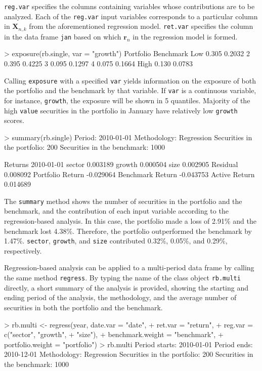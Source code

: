 \texttt{reg.var} specifies the columns containing variables whose
contributions are to be analyzed. Each of the \texttt{reg.var} input
variables corresponds to a particular column in $\mathbf{X}_{n,k}$
from the aforementioned regression model. \texttt{ret.var} specifies
the column in the data frame \texttt{jan} based on which
$\mathbf{r}_n$ in the regression model is formed.
\begin{smallverbatim}
> exposure(rb.single, var = "growth")
     Portfolio Benchmark
Low      0.305    0.2032
2        0.395    0.4225
3        0.095    0.1297
4        0.075    0.1664
High     0.130    0.0783
\end{smallverbatim}

Calling \texttt{exposure} with a specified \texttt{var} yields
information on the exposure of both the portfolio and the benchmark by
that variable. If \texttt{var} is a continuous variable, for instance,
\texttt{growth}, the exposure will be shown in 5 quantiles. Majority
of the high \texttt{value} securities in the portfolio in January have
relatively low \texttt{growth} scores.
\begin{smallverbatim}
> summary(rb.single)
Period:                            2010-01-01
Methodology:                       Regression
Securities in the portfolio:       200
Securities in the benchmark:       1000

Returns 
                 2010-01-01
sector             0.003189
growth             0.000504
size               0.002905
Residual           0.008092
Portfolio Return  -0.029064
Benchmark Return  -0.043753
Active Return      0.014689
\end{smallverbatim}

The \texttt{summary} method shows the number of securities in the
portfolio and the benchmark, and the contribution of each input
variable according to the regression-based analysis. In this case, the
portfolio made a loss of 2.91\% and the benchmark lost
4.38\%. Therefore, the portfolio outperformed the benchmark by
1.47\%. \texttt{sector}, \texttt{growth}, and \texttt{size}
contributed 0.32\%, 0.05\%, and 0.29\%, respectively.

Regression-based analysis can be applied to a multi-period data frame
by calling the same method \texttt{regress}. By typing the name of the
class object \texttt{rb.multi} directly, a short summary of the
analysis is provided, showing the starting and ending period of the
analysis, the methodology, and the average number of securities in
both the portfolio and the benchmark.
\begin{smallverbatim}
> rb.multi <- regress(year, date.var = "date",
+         ret.var = "return",
+         reg.var = c("sector", "growth", 
+                     "size"),
+         benchmark.weight = "benchmark",
+         portfolio.weight = "portfolio")
> rb.multi
Period starts:                     2010-01-01
Period ends:                       2010-12-01
Methodology:                       Regression
Securities in the portfolio:       200
Securities in the benchmark:       1000
\end{smallverbatim}

